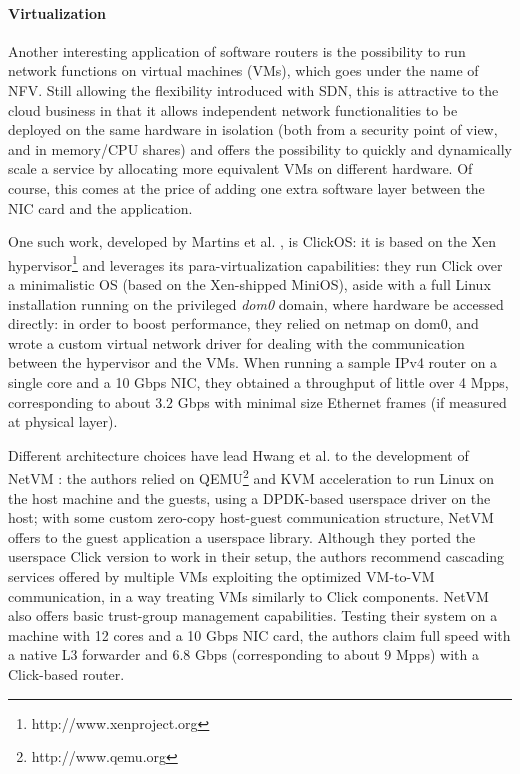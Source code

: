 \documentclass[11pt,a4paper,twoside,titlepage,openany]{book}
\begin{document}
\paragraph{Virtualization} Another interesting application of software routers is the possibility to run network functions on virtual machines (VMs), which goes under the name of \acrfull{NFV}.
Still allowing the flexibility introduced with \gls{SDN}, this is attractive to the cloud business in that it allows independent network functionalities to be deployed on the same hardware in isolation (both from a security point of view, and in memory/CPU shares) and offers the possibility to quickly and dynamically scale a service by allocating more equivalent VMs on different hardware. Of course, this comes at the price of adding one extra software layer between the NIC card and the application.

One such work, developed by Martins et al. \cite{clickos}, is ClickOS: it is based on the Xen hypervisor\footnote{http://www.xenproject.org} and leverages its para-virtualization capabilities: they run Click over a minimalistic OS (based on the Xen-shipped MiniOS), aside with a full Linux installation running on the privileged \emph{dom0} domain, where hardware be accessed directly: in order to boost performance, they relied on netmap \cite{netmap} on dom0, and wrote a custom virtual network driver for dealing with the communication between the hypervisor and the VMs. When running a sample IPv4 router on a single core and a 10 Gbps NIC, they obtained a throughput of little over 4 Mpps, corresponding to about $3.2$ Gbps with minimal size Ethernet frames (if measured at physical layer).

Different architecture choices have lead Hwang et al. to the development of NetVM \cite{netvm}: the authors relied on QEMU\footnote{http://www.qemu.org} and KVM acceleration to run Linux on the host machine and the guests, using a DPDK-based userspace driver on the host; with some custom zero-copy host-guest communication structure, NetVM offers to the guest application a userspace library. Although they ported the userspace Click version to work in their setup, the authors recommend cascading services offered by multiple VMs exploiting the optimized VM-to-VM communication, in a way treating VMs similarly to Click components. NetVM also offers basic trust-group management capabilities. Testing their system on a machine with 12 cores and a 10 Gbps NIC card, the authors claim full speed with a native L3 forwarder and 6.8 Gbps (corresponding to about 9 \gls{Mpps}) with a Click-based router.
\end{document}
